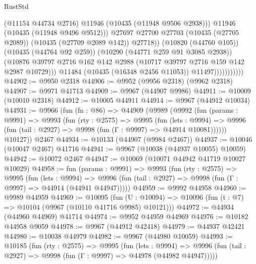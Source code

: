 \begin{lexlean}{RustStd}
\begin{coremodule}
                                    (@11154 @44734 @2716)
                                    @11946
                                    (@10435 (@11948 @9506 @2938)))
                                  @11946
                                  (@10435 (@11948 @9496 @9512)))
                                @27697
                                @27700
                                @27703
                                (@10435 (@27705 @2089))
                                (@10435 (@27709 @2089 @142))
                                @27718))
                            (@10820 (@44760 @105))
                            (@10435 (@44764 @92 @259))
                            (@10290 (@44771 @259 @91 @3085 @2938))
                            (@10876
                              @39797
                              @2716
                              @162
                              @142
                              @2988
                              (@10717 @39797 @2716 @159 @142 @2987 @10729)))
                          @11484
                          (@10435 (@16348 @2456 @11053))
                          @11497)))))))))))
@44902 := @9950 @2318
@44906 := @9952 (@9956 @2318) (@9962 @2318)
@44907 := @9971 @41713
@44909 := @9967 (@44907 @9986)
@44911 := @10009 (@10010 @2318)
@44912 := @10005 @44911
@44914 := @9967 (@44912 @10034)
@44931 := @9966
    (fun (fn : @86) =>
    @44909
      (@9989
        (@9992
          (fun (params : @9991) =>
          @9993
            (fun (rty : @2575) =>
            @9995
              (fun (lets : @9994) =>
              @9996 (fun (tail : @2927) => @9998 (fun (Γ : @9997) => @44914 @10081))))))
        @10127))
    @2467
@44934 := @10133 (@44907 (@9984 @2467))
@44937 := @10046 (@10047 @2467) @41716
@44941 := @9967 (@10038 (@44937 @10055) @10059)
@44942 := @10072 @2467
@44947 := @10069 (@10071 @44942 @41719 @10027 @10029)
@44958 := fun (params : @9991) =>
  @9993
    (fun (rty : @2575) =>
    @9995
      (fun (lets : @9994) =>
      @9996 (fun (tail : @2927) => @9998 (fun (Γ : @9997) => @44914 (@44941 @44947)))))
@44959 := @9992 @44958
@44960 := @9989 @44959
@44969 := @10095
    (fun (U : @10094) => @10096 (fun (t : @7) => @10104 (@9967 (@10110 @41716 @9985) @10121)))
@44972 := @44934 (@44960 @44969) @41714
@44974 := @9952 @44959 @44969
@44976 := @10182 @44958 @9059
@44978 := @9967 (@44912 @42418)
@44979 := @44937 @42421
@44980 := @10038 @44979
@44982 := @9967 (@44980 @10059)
@44993 := @10185
    (fun (rty : @2575) =>
    @9995
      (fun (lets : @9994) =>
      @9996 (fun (tail : @2927) => @9998 (fun (Γ : @9997) => @44978 (@44982 @44947)))))

\end{coremodule}
\end{lexlean}
